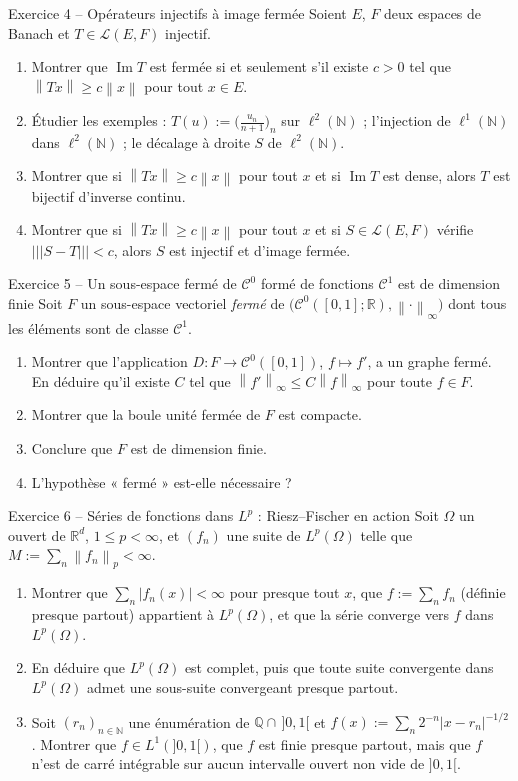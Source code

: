 \documentclass[11pt,a4paper]{article}
\newcommand{\R}{\mathbb{R}}
\newcommand{\N}{\mathbb{N}}
\newcommand{\Q}{\mathbb{Q}}
\newcommand{\norm}[1]{\left\|#1\right\|}
\newcommand{\opnorm}[1]{|\!|\!|#1|\!|\!|}
\newcommand{\Lc}{\mathcal{L}}
\newcommand{\Cz}{\mathcal{C}^0}
\DeclareMathOperator{\Ima}{Im}
\theoremstyle{definition}
\begin{document}
\begin{exo}{Exercice 4 -- Opérateurs injectifs à image fermée}
Soient $E$, $F$ deux espaces de Banach et $T\in\Lc(E,F)$ injectif.
\begin{enumerate}[label=(\alph*)]
  \item Montrer que $\Ima T$ est fermée si et seulement s'il existe $c>0$ tel que $\norm{Tx}\ge c\norm x$ pour tout $x\in E$.
  \item Étudier les exemples : $T(u):=\big(\frac{u_n}{n+1}\big)_n$ sur $\ell^2(\N)$ ; l'injection de $\ell^1(\N)$ dans $\ell^2(\N)$ ; le décalage à droite $S$ de $\ell^2(\N)$.
  \item Montrer que si $\norm{Tx}\ge c\norm x$ pour tout $x$ et si $\Ima T$ est dense, alors $T$ est bijectif d'inverse continu.
  \item Montrer que si $\norm{Tx}\ge c\norm x$ pour tout $x$ et si $S\in\Lc(E,F)$ vérifie $\opnorm{S-T}<c$, alors $S$ est injectif et d'image fermée.
\end{enumerate}
\end{exo}

\begin{exo}{Exercice 5 -- Un sous-espace fermé de $\Cz$ formé de fonctions $\mathcal C^1$ est de dimension finie}
Soit $F$ un sous-espace vectoriel \emph{fermé} de $\big(\Cz([0,1];\R),\norm\cdot_\infty\big)$ dont tous les éléments sont de classe $\mathcal C^1$.
\begin{enumerate}[label=(\alph*)]
  \item Montrer que l'application $D:F\to\Cz([0,1])$, $f\mapsto f'$, a un graphe fermé. En déduire qu'il existe $C$ tel que $\norm{f'}_\infty\le C\norm f_\infty$ pour toute $f\in F$.
  \item Montrer que la boule unité fermée de $F$ est compacte.
  \item Conclure que $F$ est de dimension finie.
  \item L'hypothèse « fermé » est-elle nécessaire ?
\end{enumerate}
\end{exo}

\begin{exo}{Exercice 6 -- Séries de fonctions dans $L^p$ : Riesz--Fischer en action}
Soit $\Omega$ un ouvert de $\R^d$, $1\le p<\infty$, et $(f_n)$ une suite de $L^p(\Omega)$ telle que $M:=\sum_n\norm{f_n}_p<\infty$.
\begin{enumerate}[label=(\alph*)]
  \item Montrer que $\sum_n|f_n(x)|<\infty$ pour presque tout $x$, que $f:=\sum_nf_n$ (définie presque partout) appartient à $L^p(\Omega)$, et que la série converge vers $f$ dans $L^p(\Omega)$.
  \item En déduire que $L^p(\Omega)$ est complet, puis que toute suite convergente dans $L^p(\Omega)$ admet une sous-suite convergeant presque partout.
  \item Soit $(r_n)_{n\in\N}$ une énumération de $\Q\cap\,]0,1[$ et $f(x):=\sum_n2^{-n}|x-r_n|^{-1/2}$. Montrer que $f\in L^1(]0,1[)$, que $f$ est finie presque partout, mais que $f$ n'est de carré intégrable sur aucun intervalle ouvert non vide de $]0,1[$.
\end{enumerate}
\end{exo}
\end{document}
